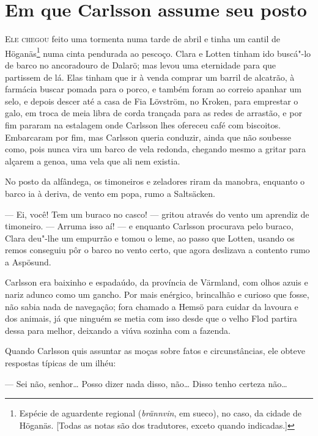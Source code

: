 \chapter[Em que Carlsson assume seu posto\ldots]{Em que Carlsson assume seu posto}
 

\textsc{Ele chegou} feito uma tormenta numa tarde de abril e tinha um cantil de
Höganäs\footnote{ Espécie de aguardente regional (\textit{brännvin}, em sueco),  
no caso, da cidade de Höganäs. [Todas as notas são dos tradutores, exceto quando indicadas.]} 
numa cinta pendurada ao pescoço. Clara e Lotten tinham ido buscá"-lo de
barco no ancoradouro de Dalarö; mas levou uma eternidade para que partissem de
lá. Elas tinham que ir à venda comprar um barril de alcatrão, à farmácia buscar
pomada para o porco, e também foram ao correio apanhar um selo, e depois descer
até a casa de Fia Lövström, no Kroken, para emprestar o galo, em troca de meia
libra de corda trançada para as redes de arrastão, e por fim pararam na
estalagem onde Carlsson lhes ofereceu café com biscoitos. Embarcaram por fim,
mas Carlsson queria conduzir, ainda que não soubesse como, pois nunca vira um barco de vela
redonda, chegando mesmo a gritar para alçarem a genoa, uma vela que ali nem existia.

No posto da alfândega, os timoneiros e zeladores riram da manobra, enquanto o
barco ia à deriva, de vento em popa, rumo a Saltsäcken.

--- Ei, você! Tem um buraco no casco! --- gritou através do vento um aprendiz de
timoneiro. --- Arruma isso aí! --- e enquanto Carlsson procurava pelo buraco, Clara
deu"-lhe um empurrão e tomou o leme, ao passo que Lotten, usando os remos conseguiu
pôr o barco no vento certo, que agora deslizava a contento rumo a Aspösund.

Carlsson era baixinho e espadaúdo, da província de Värmland, com olhos azuis e
nariz adunco como um gancho. Por mais enérgico, brincalhão e curioso que fosse,
não sabia nada de navegação; fora chamado a Hemsö para cuidar da lavoura e
dos animais, já que ninguém se metia com isso desde que o velho Flod partira dessa
para melhor, deixando a viúva sozinha com a fazenda.

Quando Carlsson quis assuntar as moças sobre fatos e circunstâncias, ele
obteve respostas típicas de um ilhéu:

--- Sei não, senhor\ldots{} Posso dizer nada disso, não\ldots{} Disso tenho
certeza não\ldots{}

